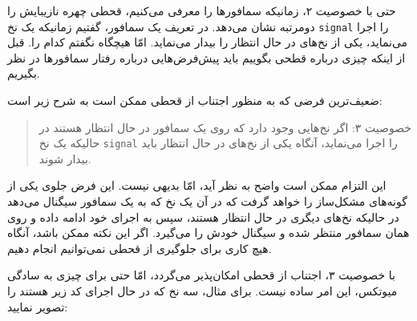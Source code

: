 \documentclass{book}
\begin{document}
    حتی با خصوصیت ۲، زمانیکه سمافورها را معرفی می‌کنیم، قحطی چهره نازیبایش را دومرتبه نشان می‌دهد. 
    در تعریف یک سمافور، گفتیم زمانیکه یک نخ {\tt signal} را اجرا می‌نماید، یکی از نخ‌های در حال انتظار را بیدار می‌نماید. امّا هیچگاه نگفتم کدام را. 
    قبل از اینکه چیزی 
    درباره قطحی بگوییم باید پیش‌فرض‌هایی درباره رفتار سمافورها در نظر بگیریم. 

    ضعیف‌ترین فرضی که به منظور اجتناب از قحطی ممکن است به شرح زیر است:

\begin{quote}
    خصوصیت ۳: اگر نخ‌هایی وجود دارد که روی یک سمافور در حال انتظار هستند در حالیکه یک نخ {\tt signal} را اجرا می‌نماید، 
    آنگاه یکی از نخ‌های در حال انتظار باید بیدار شوند. 
\end{quote}

    این التزام ممکن است واضح به نظر آید، امّا بدیهی نیست. این فرض جلوی یکی از گونه‌های مشکل‌ساز را خواهد گرفت که در آن 
    یک نخ که به یک سمافور سیگنال می‌دهد در حالیکه نخ‌های دیگری در حال انتظار هستند، سپس به اجرای خود ادامه داده و روی همان سمافور منتظر شده و 
    سیگنال خودش را می‌گیرد. اگر این نکته ممکن باشد، آنگاه هیچ کاری برای جلوگیری از قحطی نمی‌توانیم انجام دهیم. 

    با خصوصیت ۳، اجتناب از قحطی امکان‌پذیر می‌گردد، امّا حتی برای چیزی به سادگی میوتکس، این امر ساده نیست. 
    برای مثال، سه نخ که در حال اجرای کد زیر هستند را تصویر نمایید:
    
\end{document}

